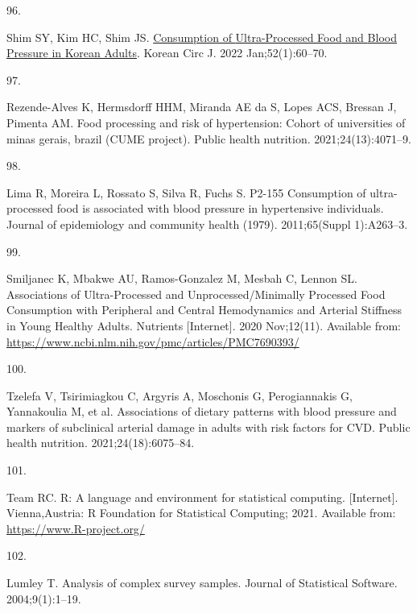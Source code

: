 \documentclass[
]{article}
\newlength{\cslhangindent}
\newlength{\csllabelwidth}
\newlength{\cslentryspacingunit} %
\newenvironment{CSLReferences}[2] %
 {%
  \setlength{\parindent}{0pt}
  \ifodd #1
  \let\oldpar\par
  \def\par{\hangindent=\cslhangindent\oldpar}
  \fi
  \setlength{\parskip}{#2\cslentryspacingunit}
 }%
 {}
\newcommand{\CSLLeftMargin}[1]{\parbox[t]{\csllabelwidth}{#1}}
\newcommand{\CSLRightInline}[1]{\parbox[t]{\linewidth - \csllabelwidth}{#1}\break}
\begin{document}
\begin{CSLReferences}{0}{0}
\leavevmode{}%
\CSLLeftMargin{96. }%
\CSLRightInline{Shim SY, Kim HC, Shim JS.
\href{https://doi.org/10.4070/kcj.2021.0228}{Consumption of
{Ultra-Processed Food} and {Blood Pressure} in {Korean Adults}}. Korean
Circ J. 2022 Jan;52(1):60--70. }

\leavevmode{}%
\CSLLeftMargin{97. }%
\CSLRightInline{Rezende-Alves K, Hermsdorff HHM, Miranda AE da S, Lopes
ACS, Bressan J, Pimenta AM. Food processing and risk of hypertension:
{Cohort} of universities of minas gerais, brazil ({CUME} project).
Public health nutrition. 2021;24(13):4071--9. }

\leavevmode{}%
\CSLLeftMargin{98. }%
\CSLRightInline{Lima R, Moreira L, Rossato S, Silva R, Fuchs S. P2-155
Consumption of ultra-processed food is associated with blood pressure in
hypertensive individuals. Journal of epidemiology and community health
(1979). 2011;65(Suppl 1):A263--3. }

\leavevmode{}%
\CSLLeftMargin{99. }%
\CSLRightInline{Smiljanec K, Mbakwe AU, Ramos-Gonzalez M, Mesbah C,
Lennon SL. Associations of Ultra-Processed and Unprocessed/Minimally
Processed Food Consumption with Peripheral and Central Hemodynamics and
Arterial Stiffness in Young Healthy Adults. Nutrients {[}Internet{]}.
2020 Nov;12(11). Available from:
\url{https://www.ncbi.nlm.nih.gov/pmc/articles/PMC7690393/}}

\leavevmode{}%
\CSLLeftMargin{100. }%
\CSLRightInline{Tzelefa V, Tsirimiagkou C, Argyris A, Moschonis G,
Perogiannakis G, Yannakoulia M, et al. Associations of dietary patterns
with blood pressure and markers of subclinical arterial damage in adults
with risk factors for {CVD}. Public health nutrition.
2021;24(18):6075--84. }

\leavevmode{}%
\CSLLeftMargin{101. }%
\CSLRightInline{Team RC. R: {A} language and environment for statistical
computing. {[}Internet{]}. {Vienna,Austria}: {R Foundation for
Statistical Computing}; 2021. Available from:
\url{https://www.R-project.org/}}

\leavevmode{}%
\CSLLeftMargin{102. }%
\CSLRightInline{Lumley T. Analysis of complex survey samples. Journal of
Statistical Software. 2004;9(1):1--19. }

\end{CSLReferences}
\end{document}
